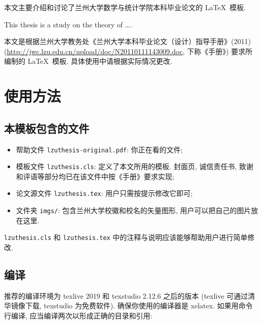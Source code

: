 \documentclass{lzuthesis}
\begin{document}
\makecover

\makeliability

\tableofcontents		%
\newpage

\begin{cnabstract}
	本文主要介绍和讨论了兰州大学数学与统计学院本科毕业论文的 \LaTeX\ 模板.
\end{cnabstract}
\newpage

\begin{enabstract}
	This thesis is a study on the theory of \dots.
\end{enabstract}
\enkeywords{\LaTeX{};}
\newpage


本文是根据兰州大学教务处《兰州大学本科毕业论文（设计）指导手册》(2011)
(\url{http://jwc.lzu.edu.cn/upload/doc/N20110111143009.doc},
下称《手册》) 要求所编制的 \LaTeX\ 模板. 具体使用中请根据实际情况更改. 

\section{使用方法}

\subsection{本模板包含的文件}

\begin{itemize}
	\item 帮助文件 \texttt{lzuthesis-original.pdf}: 你正在看的文件;
	\item 模板文件 \texttt{lzuthesis.cls}: 定义了本文所用的模板.
	封面页, 诚信责任书, 致谢和评语等部分均已在该文件中按《手册》要求实现;
	\item 论文源文件 \texttt{lzuthesis.tex}: 用户只需按提示修改它即可;
	\item 文件夹 \texttt{imgs/}: 包含兰州大学校徽和校名的矢量图形,
		用户可以把自己的图片放在这里.
\end{itemize}
\texttt{lzuthesis.cls} 和 \texttt{lzuthesis.tex}
中的注释与说明应该能够帮助用户进行简单修改.

\subsection{编译}

推荐的编译环境为 texlive 2019 和 texstudio 2.12.6 之后的版本
(texlive 可通过清华镜像下载, texstudio 为免费软件).
确保你使用的编译器是 xelatex. 如果用命令行编译,
应当编译两次以形成正确的目录和引用:
\end{document}

